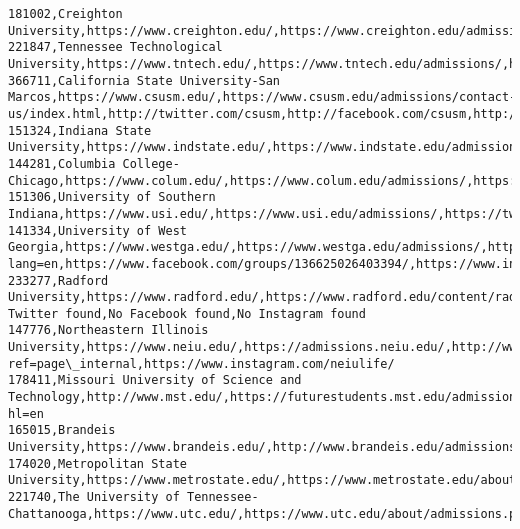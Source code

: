 \documentclass[11pt]{article}
\begin{document}
\begin{Verbatim}[commandchars=\\\{\}]
181002,Creighton University,https://www.creighton.edu/,https://www.creighton.edu/admissions,https://twitter.com/creighton,https://www.facebook.com/creightonuniversity,https://www.instagram.com/creighton1878/
221847,Tennessee Technological University,https://www.tntech.edu/,https://www.tntech.edu/admissions/,https://twitter.com/tennesseetech,https://www.facebook.com/tennesseetech,https://instagram.com/tntechuniversity/
366711,California State University-San Marcos,https://www.csusm.edu/,https://www.csusm.edu/admissions/contact-us/index.html,http://twitter.com/csusm,http://facebook.com/csusm,http://instagram.com/csusm
151324,Indiana State University,https://www.indstate.edu/,https://www.indstate.edu/admissions,https://twitter.com/indianastate,https://www.facebook.com/IndianaState,https://www.instagram.com/p/BpZmu2QHaRp/
144281,Columbia College-Chicago,https://www.colum.edu/,https://www.colum.edu/admissions/,https://twitter.com/ColumAlum,https://www.facebook.com/columadmit,https://instagram.com/columadmit
151306,University of Southern Indiana,https://www.usi.edu/,https://www.usi.edu/admissions/,https://twitter.com/USIedu,https://www.facebook.com/USIedu,https://www.instagram.com/usiedu/
141334,University of West Georgia,https://www.westga.edu/,https://www.westga.edu/admissions/,https://twitter.com/uwgspecial?lang=en,https://www.facebook.com/groups/136625026403394/,https://www.instagram.com/uwestga/
233277,Radford University,https://www.radford.edu/,https://www.radford.edu/content/radfordcore/home/admissions.html,No Twitter found,No Facebook found,No Instagram found
147776,Northeastern Illinois University,https://www.neiu.edu/,https://admissions.neiu.edu/,http://www.neiu.edu/twitter,https://www.facebook.com/pg/NEIUlife/events/?ref=page\_internal,https://www.instagram.com/neiulife/
178411,Missouri University of Science and Technology,http://www.mst.edu/,https://futurestudents.mst.edu/admissions/,\#twitter,https://www.facebook.com/MissouriSandT,https://www.instagram.com/missourisandt/?hl=en
165015,Brandeis University,https://www.brandeis.edu/,http://www.brandeis.edu/admissions/,https://twitter.com/BrandeisU,https://www.facebook.com/brandeisuniversity,https://www.instagram.com/brandeiswomensrugby
174020,Metropolitan State University,https://www.metrostate.edu/,https://www.metrostate.edu/about/departments/admissions,https://twitter.com/choose\_metro,https://www.facebook.com/ChooseMetroState,https://www.instagram.com/metrostate/
221740,The University of Tennessee-Chattanooga,https://www.utc.edu/,https://www.utc.edu/about/admissions.php,https://www.twitter.com/UTChattanooga,https://www.facebook.com/UTChattanooga,https://instagram.com/utchattanooga

\end{Verbatim}
\end{document}
